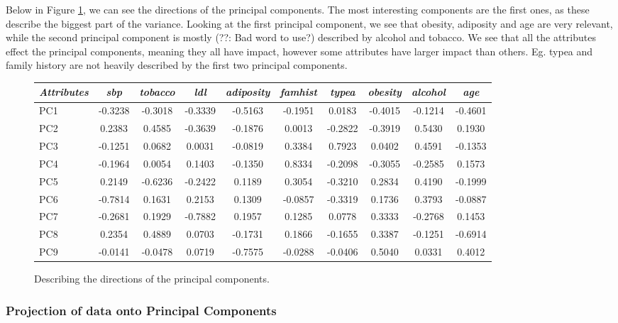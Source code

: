 Below in Figure \ref{PCADirections}, we can see the directions of the principal components. The most interesting components are the first ones, as these describe the biggest part of the variance. Looking at the first principal component, we see that obesity, adiposity and age are very relevant, while the second principal component is mostly (??: Bad word to use?) described by alcohol and tobacco. We see that all the attributes effect the principal components, meaning they all have impact, however some attributes have larger impact than others. Eg. typea and family history are not heavily described by the first two principal components.

\begin{figure}[H]
\begin{longtable}{ l c c c c c c c c c}
 \hline
 \emph{Attributes} &  \emph{sbp} &  \emph{tobacco} &  \emph{ldl} & \emph{adiposity} &  \emph{famhist} &  \emph{typea} &  \emph{obesity} &  \emph{alcohol} &  \emph{age} \\ \hline
PC1 & -0.3238 & -0.3018 &  -0.3339 &  -0.5163 & -0.1951 & 0.0183 & -0.4015 & -0.1214 & -0.4601 \\ 
PC2 & 0.2383 &  0.4585 & -0.3639 &  -0.1876 &  0.0013 &   -0.2822 & -0.3919 & 0.5430 & 0.1930 \\ 
PC3 & -0.1251 & 0.0682 &  0.0031 & -0.0819 &  0.3384 & 0.7923 & 0.0402 &  0.4591 & -0.1353 \\ 
PC4 & -0.1964 & 0.0054 & 0.1403 & -0.1350 &  0.8334 & -0.2098 & -0.3055 & -0.2585 &  0.1573 \\ 
PC5 & 0.2149 & -0.6236 & -0.2422 &  0.1189 &  0.3054 & -0.3210 & 0.2834 &  0.4190 &  -0.1999 \\ 
PC6 & -0.7814 &  0.1631 &   0.2153 &  0.1309 & -0.0857 & -0.3319 & 0.1736 & 0.3793 & -0.0887 \\ 
PC7 & -0.2681 &  0.1929 & -0.7882 &  0.1957 &  0.1285 &  0.0778 & 0.3333 & -0.2768 &  0.1453 \\ 
PC8 & 0.2354 &  0.4889 &  0.0703 & -0.1731 & 0.1866 & -0.1655 &   0.3387 & -0.1251 & -0.6914 \\ 
PC9 & -0.0141 & -0.0478 & 0.0719 & -0.7575 & -0.0288 & -0.0406 & 0.5040 & 0.0331 & 0.4012 \\ \hline  
\end{longtable}
\caption{Describing the directions of the principal components.}
\label{PCADirections}
\end{figure}

\subsubsection{Projection of data onto Principal Components}

